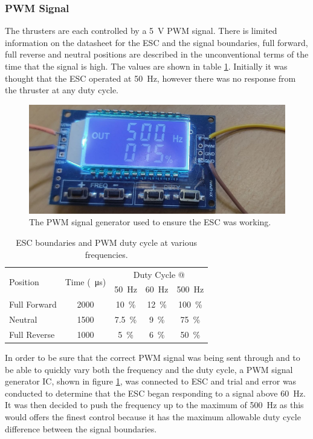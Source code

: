 	\subsubsection{PWM Signal}
	The thrusters are each controlled by a \SI{5}{\volt} PWM signal. There is limited information on the datasheet for the ESC and the signal boundaries, full forward, full reverse and neutral positions are described in the unconventional terms of the time that the signal is high. The values are shown in table \ref{tab:3:PWM}. Initially it was thought that the ESC operated at \SI{50}{\hertz}, however there was no response from the thruster at any duty cycle.\par
	\begin{figure}[!hb]
		\begin{center}
			\includegraphics[width=0.31\linewidth]{figures/pwmGen.jpg}
			\caption{The PWM signal generator used to ensure the ESC was working.}
			\label{fig:3:PWMgen}
		\end{center}
	\end{figure}
	\begin{table}[!ht]
		\begin{center}
			\caption{ESC boundaries and PWM duty cycle at various frequencies.}
			\label{tab:3:PWM}
			\begin{tabular}{|l|c|c|c|c|}
				\hline
				\multirow{2}{*}{Position} & \multirow{2}{*}{Time (\SI{}{\micro\second})} & \multicolumn{3}{c|}{Duty Cycle @}\\
				& & \multicolumn{1}{c}{\SI{50}{\hertz}} & \multicolumn{1}{c}{\SI{60}{\hertz}} & \multicolumn{1}{c|}{\SI{500}{\hertz}}\\
				\hline
				Full Forward & 2000 & \SI{10}{\percent} & \SI{12}{\percent} & \SI{100}{\percent}  \\
				\hline
				Neutral & 1500 & \SI{7.5}{\percent} & \SI{9}{\percent} & \SI{75}{\percent}  \\
				\hline
				Full Reverse & 1000 & \SI{5}{\percent} & \SI{6}{\percent} & \SI{50}{\percent}  \\
				\hline
			\end{tabular}
		\end{center}
	\end{table}
	\vspace{0.4cm}
	In order to be sure that the correct PWM signal was being sent through and to be able to quickly vary both the frequency and the duty cycle, a PWM signal generator IC, shown in figure \ref{fig:3:PWMgen}, was connected to ESC and trial and error was conducted to determine that the ESC began responding to a signal above \SI{60}{\hertz}. It was then decided to push the frequency up to the maximum of \SI{500}{\hertz} as this would offers the finest control because it has the maximum allowable duty cycle difference between the signal boundaries.\par
